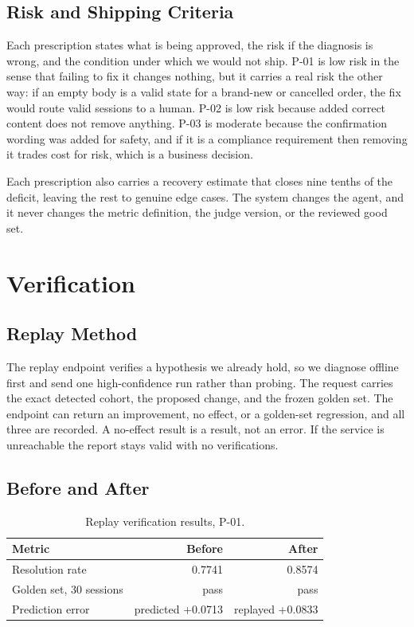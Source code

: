 \documentclass[8pt,twocolumn,a4paper]{extarticle}
\begin{document}
\subsection{Risk and Shipping Criteria}

Each prescription states what is being approved, the risk if the
diagnosis is wrong, and the condition under which we would not ship.
P-01 is low risk in the sense that failing to fix it changes nothing,
but it carries a real risk the other way: if an empty body is a valid
state for a brand-new or cancelled order, the fix would route valid
sessions to a human. P-02 is low risk because added correct content does
not remove anything. P-03 is moderate because the confirmation wording
was added for safety, and if it is a compliance requirement then
removing it trades cost for risk, which is a business decision.

Each prescription also carries a recovery estimate that closes nine
tenths of the deficit, leaving the rest to genuine edge cases. The
system changes the agent, and it never changes the metric definition,
the judge version, or the reviewed good set.


\section{Verification}

\subsection{Replay Method}

The replay endpoint verifies a hypothesis we already hold, so we
diagnose offline first and send one high-confidence run rather than
probing. The request carries the exact detected cohort, the proposed
change, and the frozen golden set. The endpoint can return an
improvement, no effect, or a golden-set regression, and all three are
recorded. A no-effect result is a result, not an error. If the service
is unreachable the report stays valid with no verifications.

\subsection{Before and After}

\begin{table}[H]
\centering
\caption{Replay verification results, P-01.}
\label{tab:replay}
\small
\begin{tabularx}{\columnwidth}{@{}X r r@{}}
\toprule
\textbf{Metric} & \textbf{Before} & \textbf{After} \\
\midrule
Resolution rate & 0.7741 & 0.8574 \\
Golden set, 30 sessions & pass & pass \\
Prediction error & predicted +0.0713 & replayed +0.0833 \\
\bottomrule
\end{tabularx}
\end{table}
\end{document}
